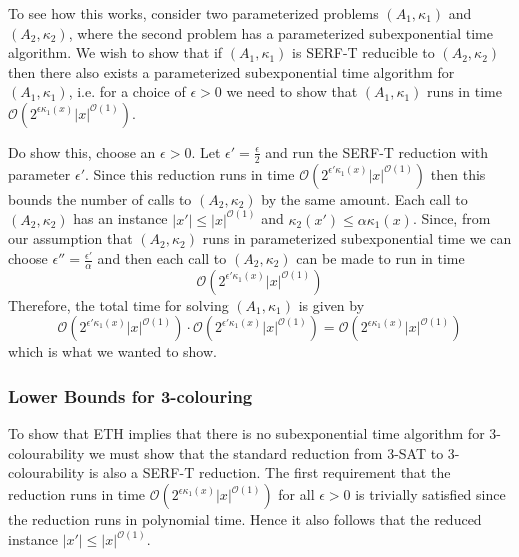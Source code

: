 To see how this works, consider two parameterized problems $(A_1, \kappa_1)$
and $(A_2, \kappa_2)$, where the second problem has a parameterized
subexponential time algorithm. We wish to show that if $(A_1, \kappa_1)$ is
SERF-T reducible to $(A_2, \kappa_2)$ then there also exists a parameterized
subexponential time algorithm for $(A_1, \kappa_1)$, i.e. for a choice of
$\epsilon > 0$ we need to show that $(A_1, \kappa_1)$ runs in time
$\mathcal{O}(2^{\epsilon \kappa_1(x)}|x|^{\mathcal{O}(1)})$.

Do show this, choose an $\epsilon > 0$.
Let $\epsilon' = \frac{\epsilon}{2}$ and run the SERF-T reduction
with parameter $\epsilon'$. Since this reduction runs in time
$\mathcal{O}(2^{\epsilon' \kappa_1(x)}|x|^{\mathcal{O}(1)})$ then this bounds
the number of calls to $(A_2, \kappa_2)$ by the same amount.
Each call to $(A_2, \kappa_2)$ has an instance $|x'| \leq |x|^{\mathcal{O}(1)}$
and $\kappa_2(x') \leq \alpha \kappa_1(x)$.
Since, from our assumption that $(A_2, \kappa_2)$ runs in parameterized subexponential
time we can choose $\epsilon'' = \frac{\epsilon'}{\alpha}$ and then each call to $(A_2, \kappa_2)$ can be made to run in time 
\begin{equation}
    \mathcal{O}(2^{\epsilon' \kappa_1(x)}|x|^{\mathcal{O}(1)})
\end{equation}
Therefore, the total time for solving $(A_1, \kappa_1)$ is given by
\begin{equation}
    \mathcal{O}(2^{\epsilon' \kappa_1(x)}|x|^{\mathcal{O}(1)}) \cdot
    \mathcal{O}(2^{\epsilon' \kappa_1(x)}|x|^{\mathcal{O}(1)}) =
    \mathcal{O}(2^{\epsilon \kappa_1(x)}|x|^{\mathcal{O}(1)})
\end{equation}
which is what we wanted to show. \cite{lokshtanov2013lower}

\subsubsection{Lower Bounds for 3-colouring}

To show that ETH implies that there is no subexponential time algorithm for 3-colourability
we must show that the standard reduction from 3-SAT to 3-colourability is also
a SERF-T reduction. The first requirement that the reduction runs in time 
$\mathcal{O}(2^{\epsilon \kappa_1(x)}|x|^{\mathcal{O}(1)})$ for all $\epsilon > 0$ is trivially
satisfied since the reduction runs in polynomial time.
Hence it also follows that the reduced instance $|x'| \leq |x|^{\mathcal{O}(1)}$.

